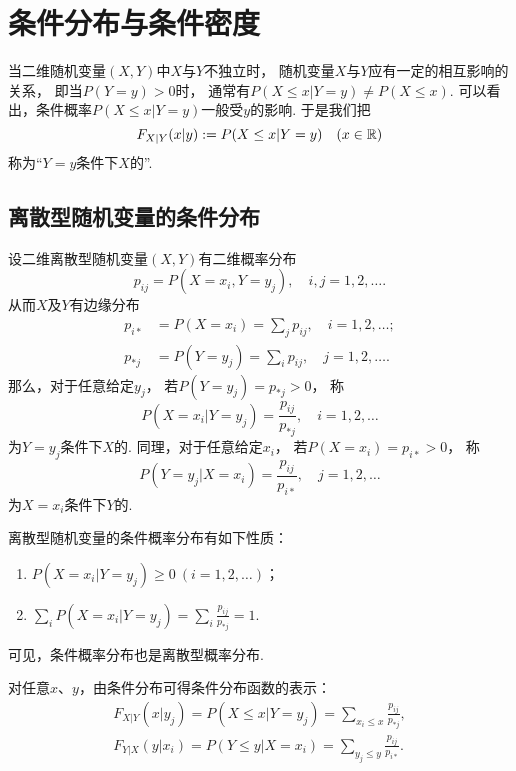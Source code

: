 \section{条件分布与条件密度}
当二维随机变量\((X,Y)\)中\(X\)与\(Y\)不独立时，
随机变量\(X\)与\(Y\)应有一定的相互影响的关系，
即当\(P(Y = y) > 0\)时，
通常有\(P(X \leq x \vert Y = y) \neq P(X \leq x)\).
可以看出，条件概率\(P(X \leq x \vert Y = y)\)一般受\(y\)的影响.
于是我们把\[
	F_{X \vert Y}(x \vert y)
	:=
	P(X \leq x \vert Y = y)
	\quad(x\in\mathbb{R})
\]称为“\(Y=y\)条件下\(X\)的”.

\subsection{离散型随机变量的条件分布}
设二维离散型随机变量\((X,Y)\)有二维概率分布\[
	p_{ij} = P(X=x_i,Y=y_j),
	\quad i,j=1,2,\dotsc.
\]
从而\(X\)及\(Y\)有边缘分布\begin{align*}
	p_{i*}
	&= P(X=x_i)
	= \sum_j p_{ij},
	\quad i=1,2,\dotsc; \\
	p_{*j}
	&= P(Y=y_j)
	= \sum_i p_{ij},
	\quad j=1,2,\dotsc.
\end{align*}
那么，对于任意给定\(y_j\)，
若\(P(Y=y_j) = p_{*j} > 0\)，
称\[
	P(X=x_i \vert Y=y_j) = \frac{p_{ij}}{p_{*j}},
	\quad i=1,2,\dotsc
\]为\(Y=y_j\)条件下\(X\)的.
同理，对于任意给定\(x_i\)，
若\(P(X=x_i) = p_{i*} > 0\)，
称\[
	P(Y=y_j \vert X=x_i) = \frac{p_{ij}}{p_{i*}},
	\quad j=1,2,\dotsc
\]为\(X=x_i\)条件下\(Y\)的.

\begin{property}
离散型随机变量的条件概率分布有如下性质：\begin{enumerate}
	\item \(P(X=x_i \vert Y=y_j) \geq 0\ (i=1,2,\dotsc)\)；
	\item \(\sum_i P(X=x_i \vert Y=y_j) = \sum_i \frac{p_{ij}}{p_{*j}} = 1\).
\end{enumerate}
可见，条件概率分布也是离散型概率分布.
\end{property}

\begin{theorem}
对任意\(x\)、\(y\)，由条件分布可得条件分布函数的表示：
\begin{align*}
	F_{X \vert Y}(x \vert y_j)
	= P(X \leq x \vert Y=y_j)
	= \sum_{x_i \leq x}{\frac{p_{ij}}{p_{*j}}}, \\
	F_{Y \vert X}(y \vert x_i)
	= P(Y \leq y \vert X=x_i)
	= \sum_{y_j \leq y}{\frac{p_{ij}}{p_{i*}}}.
\end{align*}
\end{theorem}


